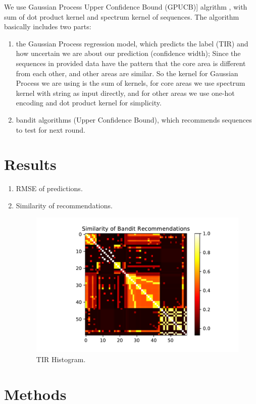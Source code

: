\documentclass{article}
\begin{document}
We use Gaussian Process Upper Confidence Bound (GPUCB)] algrithm \cite{srinivas2012information}, with sum of dot product kernel and spectrum kernel of sequences. The algorithm basically includes two parts:

\begin{enumerate}
    \item the Gaussian Process regression model, which predicts the label (TIR) and how uncertain we are about our prediction (confidence width); Since the sequences in provided data have the pattern that the core area is different from each other, and other areas are similar. So the kernel for Gaussian Process we are using is the sum of kernels, for core areas we use spectrum kernel with string as input directly, and for other areas we use one-hot encoding and dot product kernel for simplicity. 
    \item bandit algorithms (Upper Confidence Bound), which recommends sequences to test for next round.
\end{enumerate}

\section{Results}

\begin{enumerate}
    \item RMSE of predictions.
    
    \item Similarity of recommendations. 
    \begin{figure}[t]
    \centering
    \includegraphics[scale=0.7]{plots/similarity_first_round_recommendation.pdf}
    \caption{TIR Histogram.}
    \label{fig: TIR Histogram.}
\end{figure}
\end{enumerate}{}

\section{Methods}

\newpage

\printbibliography
\end{document}
